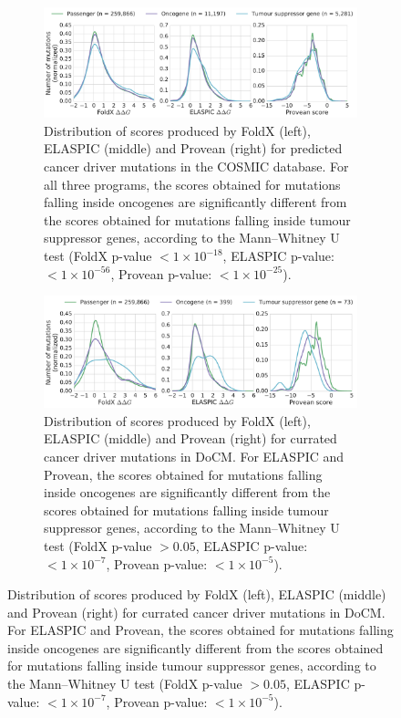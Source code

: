 
\begin{figure}[tb]
	\centering
	\begin{subfigure}[t]{1\textwidth}
		\includegraphics[width=1\linewidth]{static/elaspic_training_set/validation_cancer/score_distribution_full.pdf}
		\caption{
			Distribution of scores produced by FoldX (left), ELASPIC (middle) and Provean (right) for predicted cancer driver mutations in the COSMIC database. For all three programs, the scores obtained for mutations falling inside oncogenes are significantly different from the scores obtained for mutations falling inside tumour suppressor genes, according to the Mann--Whitney U test (FoldX p-value $< 1 \times 10^{-18}$, ELASPIC p-value: $< 1 \times 10^{-56}$, Provean p-value: $< 1 \times 10^{-25}$).
		}
		\label{fig:validation_cancer_score_distribution_full}
		\vspace*{10mm}
	\end{subfigure}

	\begin{subfigure}[t]{1\textwidth}
		\includegraphics[width=1\linewidth]{static/elaspic_training_set/validation_cancer/score_distribution_high_confidence.pdf}
		\caption{
		Distribution of scores produced by FoldX (left), ELASPIC (middle) and Provean (right) for currated cancer driver mutations in DoCM. For ELASPIC and Provean, the scores obtained for mutations falling inside oncogenes are significantly different from the scores obtained for mutations falling inside tumour suppressor genes, according to the Mann--Whitney U test (FoldX p-value $> 0.05$, ELASPIC p-value: $< 1 \times 10^{-7}$, Provean p-value: $< 1 \times 10^{-5}$).
		}
		\label{fig:validation_cancer_score_distribution_high_confidence}
		\vspace*{5mm}
	\end{subfigure}


\end{figure}
